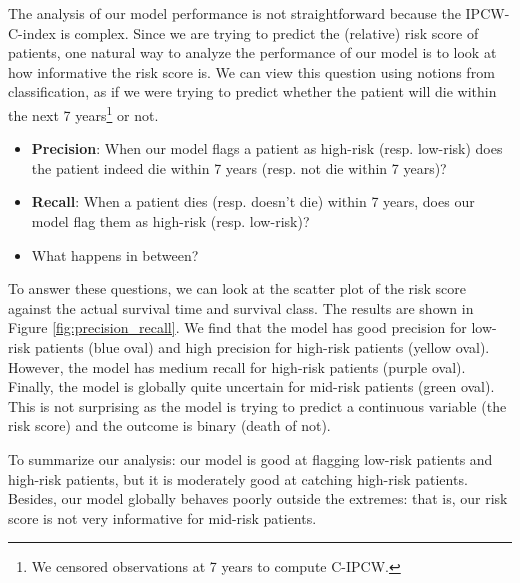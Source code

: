 \documentclass{article}
\begin{document}
The analysis of our model performance is not straightforward because the IPCW-C-index is complex. Since we are trying to predict the (relative) risk score of patients, one natural way to analyze the performance of our model is to look at how informative the risk score is. We can view this question using notions from classification, as if we were trying to predict whether the patient will die within the next 7 years\footnote{We censored observations at 7 years to compute C-IPCW.} or not.
\begin{itemize}
    \item \textbf{Precision}: When our model flags a patient as high-risk (resp. low-risk) does the patient indeed die within 7 years (resp. not die within 7 years)?
    \item \textbf{Recall}: When a patient dies (resp. doesn't die) within 7 years, does our model flag them as high-risk (resp. low-risk)?
    \item What happens in between?
\end{itemize}

To answer these questions, we can look at the scatter plot of the risk score against the actual survival time and survival class. The results are shown in Figure \ref{fig:precision_recall}. We find that the model has good precision for low-risk patients (blue oval) and high precision for high-risk patients (yellow oval). However, the model has medium recall for high-risk patients (purple oval). Finally, the model is globally quite uncertain for mid-risk patients (green oval). This is not surprising as the model is trying to predict a continuous variable (the risk score) and the outcome is binary (death of not).

To summarize our analysis: our model is good at flagging low-risk patients and high-risk patients, but it is moderately good at catching high-risk patients. Besides, our model globally behaves poorly outside the extremes: that is, our risk score is not very informative for mid-risk patients.
\end{document}
